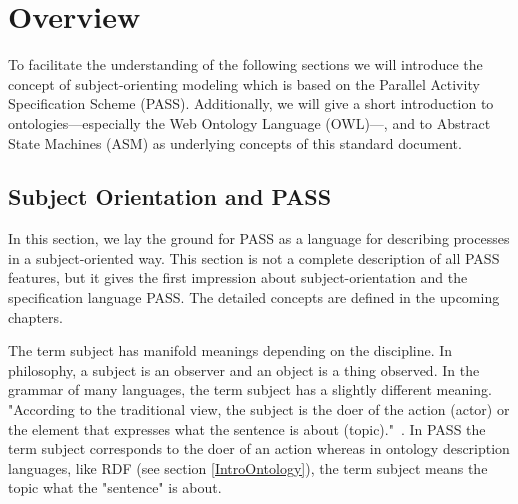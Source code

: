

\chapter{Overview}


To facilitate the understanding of the following sections we will introduce the concept of subject-orienting modeling which is based on the Parallel Activity Specification Scheme (PASS). Additionally, we will give a short introduction to ontologies---especially the Web Ontology Language (OWL)---, and to Abstract State Machines (ASM) as underlying concepts of this standard document.

\section{Subject Orientation and PASS }
\label{SubjectOrient}


In this section, we lay the ground for PASS as a language for describing processes in a subject-oriented way. This section is not a complete description of all PASS features, but it gives the first impression about subject-orientation and the specification language PASS. The detailed concepts are defined in the upcoming chapters.

The term subject has manifold meanings depending on the discipline. In philosophy, a subject is an observer and an object is a thing observed. In the grammar of many languages, the term subject has a slightly different meaning. "According to the traditional view, the subject is the doer of the action (actor) or the element that expresses what the sentence is about (topic)."~\cite{Keenan:1976aa}. In PASS the term subject corresponds to the doer of an action whereas in ontology description languages, like RDF (see section \ref{IntroOntology}), the term subject means the topic what the "sentence" is about.

